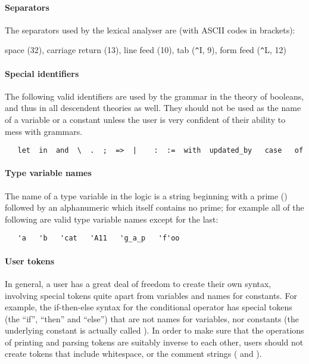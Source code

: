 

\paragraph{Separators}

The separators used by the \HOL{} lexical analyser are (with ASCII codes in
brackets):

\bigskip

space (32), carriage return (13), line feed (10), tab ({\verb+^+}I, 9),
form feed ({\verb+^+}L, 12)


\paragraph{Special identifiers}

The following valid identifiers are used by the grammar in the theory
of booleans, and thus in all descendent theories as well.  They should
not be used as the name of a variable or a constant unless the user is
very confident of their ability to mess with grammars.
%
\begin{verbatim}
   let  in  and  \  .  ;  =>  |    :  :=  with  updated_by   case   of
\end{verbatim}

\paragraph {Type variable names}\label{tyvars}

The name of a type variable in the \HOL{} logic is a string
beginning with a prime () followed by an alphanumeric which itself
contains no prime; for example all of the following are valid type
variable names except for the last:
%
\begin{hol}
\begin{verbatim}
   'a   'b   'cat   'A11   'g_a_p   'f'oo
\end{verbatim}
\end{hol}

\paragraph{User tokens}
In general, a \HOL{} user has a great deal of freedom to create their own syntax, involving special tokens quite apart from variables and names for constants.
For example, the if-then-else syntax for the conditional operator %
%
has special tokens (the ``if'', ``then'' and ``else'') that are not names for variables, nor constants (the underlying constant is actually called ).
In order to make sure that the operations of printing and parsing tokens are suitably inverse to each other, users should not create tokens that include whitespace, or the comment strings (\ml{(*} and \ml{*)}).

